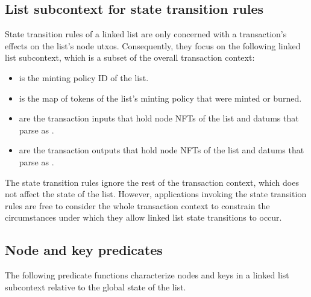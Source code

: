 \documentclass[../midgard.tex]{subfiles}
\begin{document}
\subsection{List subcontext for state transition rules}
\label{h:list-subcontext}

State transition rules of a linked list are only concerned with a transaction's effects on the list's node utxos. Consequently, they focus on the following linked list subcontext, which is a subset of the overall transaction context:
\begin{itemize}
    \item {} is the minting policy ID of the list.
    \item {} is the map of tokens of the list's minting policy that were minted or burned.
    \item {} are the transaction inputs that hold node NFTs of the list and datums that parse as . 
    \item {} are the transaction outputs that hold node NFTs of the list and datums that parse as .
\end{itemize}

The state transition rules ignore the rest of the transaction context, which does not affect the state of the list. However, applications invoking the state transition rules are free to consider the whole transaction context to constrain the circumstances under which they allow linked list state transitions to occur.

\subsection{Node and key predicates}
\label{h:list-node-key-predicates}

The following predicate functions characterize nodes and keys in a linked list subcontext relative to the global state of the list.
\end{document}
